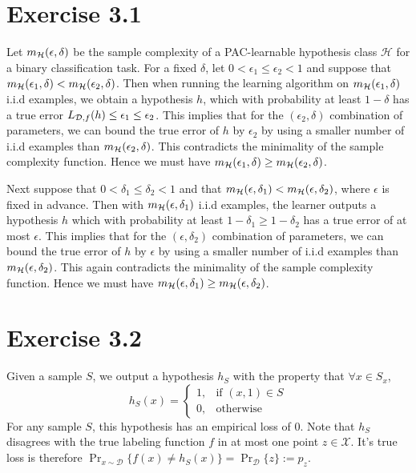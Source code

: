 \section*{Exercise 3.1}

Let $m_{\mathcal{H}}(\epsilon, \delta)$ be the sample complexity of a PAC-learnable hypothesis class 
$\mathcal{H}$ for a binary classification task. For a fixed $\delta$, let 
$0 < \epsilon_1 \leq \epsilon_2 < 1$ and suppose that 
$m_{\mathcal{H}}(\epsilon_1, \delta) < m_{\mathcal{H}}(\epsilon_2, \delta)$. Then when 
running the learning algorithm on $m_{\mathcal{H}}(\epsilon_1, \delta)$ i.i.d examples, 
we obtain a hypothesis $h$, which with probability at least $1 - \delta$ has 
a true error $L_{\mathcal{D}, f}(h) \leq \epsilon_1 \leq \epsilon_2$. This
implies that for the $(\epsilon_2, \delta)$ combination of parameters, we can bound 
the true error of $h$ by $\epsilon_2$ by using a smaller number of i.i.d examples 
than $m_{\mathcal{H}}(\epsilon_2, \delta)$. This contradicts
the minimality of the sample complexity function. Hence we must have 
$m_{\mathcal{H}}(\epsilon_1, \delta) \geq m_{\mathcal{H}}(\epsilon_2, \delta)$.

Next suppose that $0 < \delta_1 \leq \delta_2 < 1$ and that 
$m_{\mathcal{H}}(\epsilon, \delta_1) < m_{\mathcal{H}}(\epsilon, \delta_2)$, where $\epsilon$
is fixed in advance. Then with $m_{\mathcal{H}}(\epsilon, \delta_1)$ i.i.d examples, the
learner outputs a hypothesis $h$ which with probability at least 
$1 - \delta_1 \geq 1 - \delta_2$ has a true error of at most $\epsilon$. This
implies that for the $(\epsilon, \delta_2)$ combination of parameters, we can bound 
the true error of $h$ by $\epsilon$ by using a smaller number of i.i.d examples 
than $m_{\mathcal{H}}(\epsilon, \delta_2)$. This again contradicts
the minimality of the sample complexity function. Hence we must have 
$m_{\mathcal{H}}(\epsilon, \delta_1) \geq m_{\mathcal{H}}(\epsilon, \delta_2)$.

\section*{Exercise 3.2}

Given a sample $S$, we output a hypothesis $h_S$ with the property that 
$\forall x \in S_x$, 
\[
    h_S(x) = \left \{ \begin{array}{rl} 
                            1, & \text{if $(x, 1) \in S$} \\
                            0, & \text{otherwise}
                      \end{array} \right .
\]
For any sample $S$, this hypothesis has an empirical loss of $0$. Note 
that $h_S$ disagrees with the true labeling function $f$ in at most one point 
$z \in \mathcal{X}$. It's true loss is therefore 
$\Pr_{x \sim \mathcal{D}} \{ f(x) \neq h_S(x)\} = \Pr_{\mathcal{D}} \{z\} := p_z$. 

